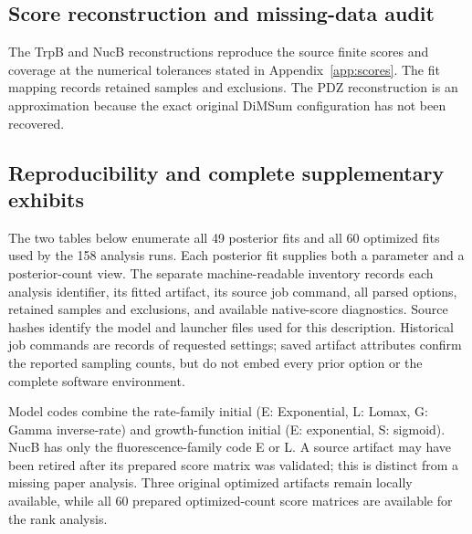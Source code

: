 \subsection{Score reconstruction and missing-data audit}
\label{app:score-audit}
The TrpB and NucB reconstructions reproduce the source finite scores and
coverage at the numerical tolerances stated in Appendix~\ref{app:scores}.
The fit mapping records retained samples and exclusions. The PDZ reconstruction
is an approximation because the exact original DiMSum configuration has
not been recovered.

\subsection{Reproducibility and complete supplementary exhibits}
\label{app:reproducibility}

The two tables below enumerate all 49 posterior fits and all 60 optimized
fits used by the 158 analysis runs. Each posterior fit supplies both a
parameter and a posterior-count view. The separate machine-readable inventory
records each analysis identifier, its fitted artifact, its source job command,
all parsed options, retained samples and exclusions, and available native-score
diagnostics. Source hashes identify the model and launcher files used for this
description. Historical job commands are records of requested settings; saved
artifact attributes confirm the reported sampling counts, but do not embed
every prior option or the complete software environment.

Model codes combine the rate-family initial (E: Exponential, L: Lomax,
G: Gamma inverse-rate) and growth-function initial (E: exponential,
S: sigmoid). NucB has only the fluorescence-family code E or L. A source
artifact may have been retired after its prepared score matrix was validated;
this is distinct from a missing paper analysis. Three original optimized
artifacts remain locally available, while all 60 prepared optimized-count
score matrices are available for the rank analysis.



